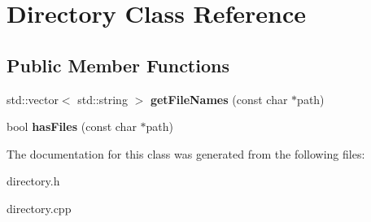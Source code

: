 \hypertarget{classDirectory}{}\section{Directory Class Reference}
\label{classDirectory}
\subsection*{Public Member Functions}
\begin{DoxyCompactItemize}
\item 
\mbox{\label{classDirectory_a64d51f4fdec32c7614756cdebde2a528}} 
std\+::vector$<$ std\+::string $>$ {\bfseries get\+File\+Names} (const char $\ast$path)
\item 
\mbox{\label{classDirectory_acf42c79df6250c77550317d685cb5986}} 
bool {\bfseries has\+Files} (const char $\ast$path)
\end{DoxyCompactItemize}


The documentation for this class was generated from the following files\+:\begin{DoxyCompactItemize}
\item 
directory.\+h\item 
directory.\+cpp\end{DoxyCompactItemize}
